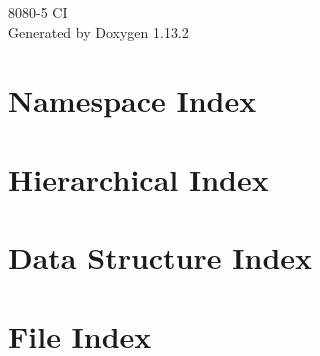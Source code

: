 \documentclass[twoside]{book}
\newcommand{\+}{\discretionary{\mbox{\scriptsize$\hookleftarrow$}}{}{}}
\newcommand{\clearemptydoublepage}{%
    \newpage{\pagestyle{empty}\cleardoublepage}%
  }
\begin{document}
  \raggedbottom
    \hypersetup{pageanchor=false,
                bookmarksnumbered=true,
                pdfencoding=unicode
               }
  \begin{titlepage}
  \vspace*{7cm}
  \begin{center}%
  {\Large 8080-\/5 CI}\\
  \vspace*{1cm}
  {\large Generated by Doxygen 1.13.2}\\
  \end{center}
  \end{titlepage}
  \clearemptydoublepage
  \tableofcontents
  \clearemptydoublepage
  \hypersetup{pageanchor=true}



\chapter{Namespace Index}

\chapter{Hierarchical Index}

\chapter{Data Structure Index}

\chapter{File Index}

\end{document}
